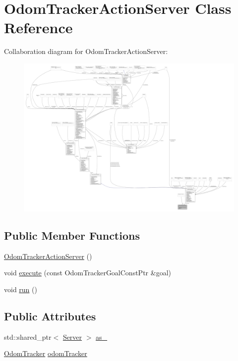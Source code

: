 \hypertarget{classOdomTrackerActionServer}{}\section{Odom\+Tracker\+Action\+Server Class Reference}
\label{classOdomTrackerActionServer}


Collaboration diagram for Odom\+Tracker\+Action\+Server\+:
\nopagebreak
\begin{figure}[H]
\begin{center}
\leavevmode
\includegraphics[width=350pt]{classOdomTrackerActionServer__coll__graph}
\end{center}
\end{figure}
\subsection*{Public Member Functions}
\begin{DoxyCompactItemize}
\item 
\hyperlink{classOdomTrackerActionServer_a98b7fba6da04e1afcf1000f937be7fef}{Odom\+Tracker\+Action\+Server} ()
\item 
void \hyperlink{classOdomTrackerActionServer_afa69287377bb2a12c5346cbe8d68cb04}{execute} (const Odom\+Tracker\+Goal\+Const\+Ptr \&goal)
\item 
void \hyperlink{classOdomTrackerActionServer_a8ab6984c7383949a048d72437e9f79d3}{run} ()
\end{DoxyCompactItemize}
\subsection*{Public Attributes}
\begin{DoxyCompactItemize}
\item 
std\+::shared\+\_\+ptr$<$ \hyperlink{odom__tracker__node_8cpp_a9884574d0480319430f628f79afc0500}{Server} $>$ \hyperlink{classOdomTrackerActionServer_a28bed1d95003d837b2b47053dbc66878}{as\+\_\+}
\item 
\hyperlink{classcl__move__base__z_1_1odom__tracker_1_1OdomTracker}{Odom\+Tracker} \hyperlink{classOdomTrackerActionServer_a3e5c4328d3206fbd2fd2708f0aefe651}{odom\+Tracker}
\end{DoxyCompactItemize}


